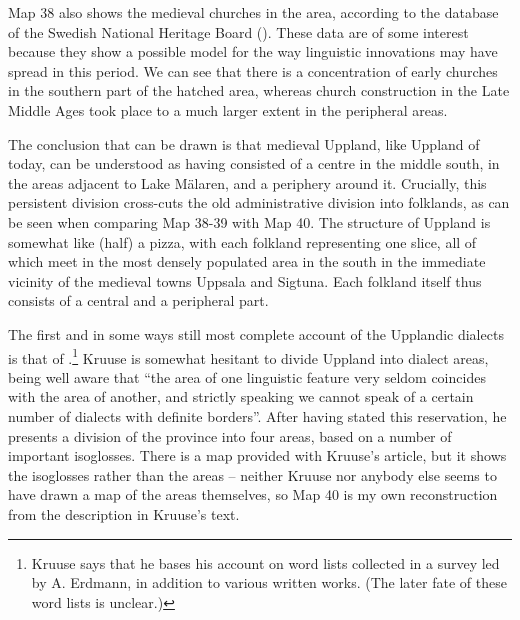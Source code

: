 Map 38 also shows the medieval churches in the area, according to the database of the Swedish National Heritage Board (\href{http://www.raa.se}{}). These data are of some interest because they show a possible model for the way linguistic innovations may have spread in this period. We can see that there is a concentration of early churches in the southern part of the hatched area, whereas church construction in the Late Middle Ages took place to a much larger extent in the peripheral areas.




The conclusion that can be drawn is that medieval Uppland, like Uppland of today, can be understood as having consisted of a centre in the middle south, in the areas adjacent to Lake Mälaren, and a periphery around it. Crucially, this persistent division cross-cuts the old administrative division into folklands, as can be seen when comparing Map 38-39 with Map 40. The structure of Uppland is somewhat like (half) a pizza, with each folkland representing one slice, all of which meet in the most densely populated area in the south in the immediate vicinity of the medieval towns Uppsala and Sigtuna. Each folkland itself thus consists of a central and a peripheral part. 




 The first and in some ways still most complete account of the Upplandic dialects is that of \citet{Kruuse1908}.\footnote{ Kruuse says that he bases his account on word lists collected in a survey led by A. Erdmann, in addition to various written works. (The later fate of these word lists is unclear.) } Kruuse is somewhat hesitant to divide Uppland into dialect areas, being well aware that “the area of one linguistic feature very seldom coincides with the area of another, and strictly speaking we cannot speak of a certain number of dialects with definite borders”. After having stated this reservation, he presents a division of the province into four areas, based on a number of important isoglosses. There is a map provided with Kruuse’s article, but it shows the isoglosses rather than the areas – neither Kruuse nor anybody else seems to have drawn a map of the areas themselves, so Map 40 is my own reconstruction from the description in Kruuse’s text. 




